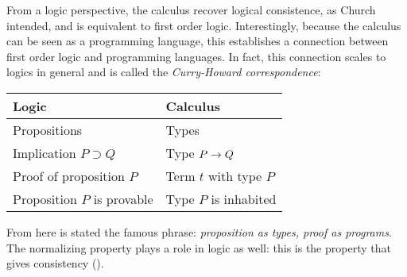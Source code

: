 From a logic perspective, the calculus recover logical consistence, as Church intended, and is equivalent
to first order logic. Interestingly, because the calculus can be seen as a programming language, this establishes
a connection between first order logic and programming languages. In fact, this connection scales to logics 
in general and is called the \emph{Curry-Howard correspondence}:
\begin{center}
    \begin{tabular}{ll}
         Logic & Calculus \\
         \hline
         Propositions & Types \\
         Implication $P\supset Q$ & Type $\arrow{P}{Q}$ \\
         Proof of proposition $P$ & Term $t$ with type $P$ \\
         Proposition $P$ is provable & Type $P$ is inhabited
    \end{tabular}
\end{center}
From here is stated the famous phrase: \emph{proposition as types, proof as programs}.
The normalizing property plays a role in logic as well: this is the property that
gives consistency ().

